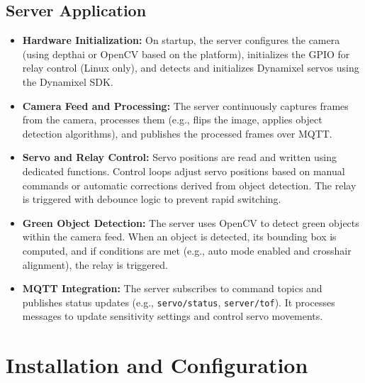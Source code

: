 \documentclass[12pt]{article}
\begin{document}
\subsection{Server Application}
\begin{itemize}[leftmargin=*, label={--}]
    \item \textbf{Hardware Initialization:} On startup, the server configures the camera (using depthai or OpenCV based on the platform), initializes the GPIO for relay control (Linux only), and detects and initializes Dynamixel servos using the Dynamixel SDK.
    \item \textbf{Camera Feed and Processing:} The server continuously captures frames from the camera, processes them (e.g., flips the image, applies object detection algorithms), and publishes the processed frames over MQTT.
    \item \textbf{Servo and Relay Control:} Servo positions are read and written using dedicated functions. Control loops adjust servo positions based on manual commands or automatic corrections derived from object detection. The relay is triggered with debounce logic to prevent rapid switching.
    \item \textbf{Green Object Detection:} The server uses OpenCV to detect green objects within the camera feed. When an object is detected, its bounding box is computed, and if conditions are met (e.g., auto mode enabled and crosshair alignment), the relay is triggered.
    \item \textbf{MQTT Integration:} The server subscribes to command topics and publishes status updates (e.g., \texttt{servo/status}, \texttt{server/tof}). It processes messages to update sensitivity settings and control servo movements.
\end{itemize}

\section{Installation and Configuration}
\end{document}
